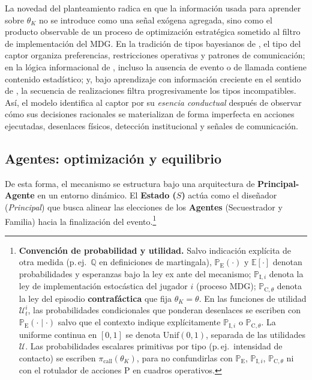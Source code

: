 \documentclass[12pt]{article}
\providecommand{\textcite}{\citet}
\theoremstyle{definition}
\theoremstyle{remark}
\newcommand{\E}{\mathbb{E}}
\newcommand{\ProbE}{\mathbb{P}_{\mathrm{E}}}
\newcommand{\ProbI}[1]{\mathbb{P}_{\mathrm{I},#1}}
\newcommand{\ProbC}[1]{\mathbb{P}_{\mathrm{C},#1}}
\newcommand{\Unif}{\mathrm{Unif}}
\newcommand{\1}{\mathbf{1}}
\begin{document}
La novedad del planteamiento radica en que la información usada para aprender sobre $\theta_K$ no se introduce como una señal exógena agregada, sino como el producto observable de un proceso de optimización estratégica sometido al filtro de implementación del MDG. En la tradición de tipos bayesianos de \textcite{Harsanyi1967GamesI,Harsanyi1968GamesII,Harsanyi1968GamesIII}, el tipo del captor organiza preferencias, restricciones operativas y patrones de comunicación; en la lógica informacional de \textcite{McCall1970}, incluso la ausencia de evento o de llamada contiene contenido estadístico; y, bajo aprendizaje con información creciente en el sentido de \textcite{BlackwellDubins1962}, la secuencia de realizaciones filtra progresivamente los tipos incompatibles. Así, el modelo identifica al captor por su \emph{esencia conductual} después de observar cómo sus decisiones racionales se materializan de forma imperfecta en acciones ejecutadas, desenlaces físicos, detección institucional y señales de comunicación.







\subsection{Agentes: optimización y equilibrio}
\label{sec:actions}
\label{sec:mapa-acciones}

De esta forma, el mecanismo se estructura bajo una arquitectura de \textbf{Principal-Agente} en un entorno dinámico. El \textbf{Estado ($S$)} actúa como el diseñador (\textit{Principal}) que busca alinear las elecciones de los \textbf{Agentes} (Secuestrador y Familia) hacia la finalización del evento.\footnote{%
\textbf{Convención de probabilidad y utilidad.} Salvo indicación explícita de otra medida \textup{(}p.\,ej.\ $\mathbb{Q}$ en definiciones de martingala\textup{)}, $\ProbE(\cdot)$ y $\E[\cdot]$ denotan probabilidades y esperanzas bajo la ley ex ante del mecanismo; $\ProbI{i}$ denota la ley de implementación estocástica del jugador $i$ \textup{(}proceso MDG\textup{)}; $\ProbC{\theta}$ denota la ley del episodio \textbf{contrafáctica} que fija $\theta_K=\theta$. En las funciones de utilidad $\mathcal{U}_t^{i}$, las probabilidades condicionales que ponderan desenlaces se escriben con $\ProbE(\cdot\mid\cdot)$ salvo que el contexto indique explícitamente $\ProbI{i}$ o $\ProbC{\theta}$. La uniforme continua en $[0,1]$ se denota $\Unif(0,1)$, separada de las utilidades $\mathcal{U}$. Las probabilidades escalares primitivas por tipo \textup{(}p.\,ej.\ intensidad de contacto\textup{)} se escriben $\pi_{\mathrm{call}}(\theta_K)$, para no confundirlas con $\ProbE$, $\ProbI{i}$, $\ProbC{\theta}$ ni con el rotulador de acciones $\mathrm{P}$ en cuadros operativos.}
\end{document}
